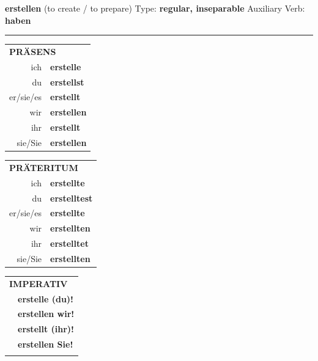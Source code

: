 \documentclass[10pt,a4paper]{revtex4-2}
\begin{document}
\begin{verbbox}
    {\Large \bf erstellen} (to create / to prepare) \hfill Type: \textbf{regular, inseparable} \hfill Auxiliary Verb: \textbf{haben} 
    
     \vspace{5pt}

    \hrule
    
    \vspace{5pt}

  \begin{tabular}{rl}
     \multicolumn{2}{l}{\textbf{PRÄSENS} }\\
    ich & \textbf{erstelle}\\
    du & \textbf{erstellst}\\
    er/sie/es & \textbf{erstellt}\\
    wir & \textbf{erstellen}\\
    ihr & \textbf{erstellt}\\
    sie/Sie & \textbf{erstellen}\\
  \end{tabular}
  \hfill
     \begin{tabular}{rl}
    \multicolumn{2}{l}{\textbf{PRÄTERITUM} }\\
    ich & \textbf{erstellte}\\
    du & \textbf{erstelltest}\\
    er/sie/es & \textbf{erstellte}\\
    wir & \textbf{erstellten}\\
    ihr & \textbf{erstelltet}\\
    sie/Sie & \textbf{erstellten}\\
  \end{tabular}
  \hfill
  \begin{tabular}{rl}
     \multicolumn{2}{l}{\textbf{IMPERATIV} }\\
   & \textbf{erstelle (du)!}\\
   & \textbf{erstellen wir!}\\
   & \textbf{erstellt (ihr)!}\\
   & \textbf{erstellen Sie!}\\
   & \vspace{10pt}
  \end{tabular}

    \vspace{10pt}


\end{verbbox}
\end{document}
